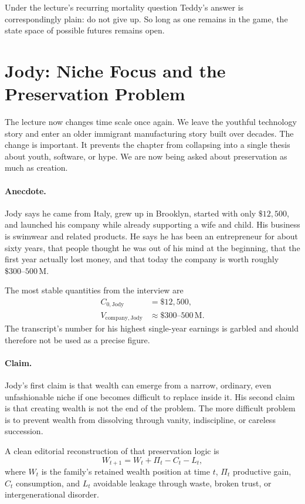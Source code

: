Under the lecture's recurring mortality question Teddy's answer is correspondingly plain: do not give up. So long as one remains in the game, the state space of possible futures remains open.

\section{Jody: Niche Focus and the Preservation Problem}

The lecture now changes time scale once again. We leave the youthful technology story and enter an older immigrant manufacturing story built over decades. The change is important. It prevents the chapter from collapsing into a single thesis about youth, software, or hype. We are now being asked about preservation as much as creation.

\paragraph{Anecdote.}
Jody says he came from Italy, grew up in Brooklyn, started with only \(\$12{,}500\), and launched his company while already supporting a wife and child. His business is swimwear and related products. He says he has been an entrepreneur for about sixty years, that people thought he was out of his mind at the beginning, that the first year actually lost money, and that today the company is worth roughly \(\$300\text{--}500\,\mathrm{M}\).

The most stable quantities from the interview are
\begin{align}
C_{0,\mathrm{Jody}} &= \$12{,}500,\\
V_{\mathrm{company,Jody}} &\approx \$300\text{--}500\,\mathrm{M}.
\end{align}
The transcript's number for his highest single-year earnings is garbled and should therefore not be used as a precise figure.

\paragraph{Claim.}
Jody's first claim is that wealth can emerge from a narrow, ordinary, even unfashionable niche if one becomes difficult to replace inside it. His second claim is that creating wealth is not the end of the problem. The more difficult problem is to prevent wealth from dissolving through vanity, indiscipline, or careless succession.

A clean editorial reconstruction of that preservation logic is
\begin{equation}
W_{t+1} = W_t + \Pi_t - C_t - L_t,
\end{equation}
where \(W_t\) is the family's retained wealth position at time \(t\), \(\Pi_t\) productive gain, \(C_t\) consumption, and \(L_t\) avoidable leakage through waste, broken trust, or intergenerational disorder.

